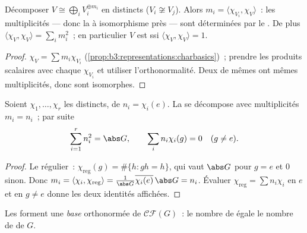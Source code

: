 \begin{corollary}\label{cor:b3:representations:multiplicity}
Décomposer $V \cong \bigoplus_i V_i^{\oplus m_i}$ en
 distincts ($V_i \not\cong V_j$). Alors $m_i =
\langle \chi_{V_i}, \chi_V\rangle$~: les multiplicités --- donc
la  à isomorphisme près --- sont déterminées par
le . De plus $\langle \chi_V, \chi_V\rangle = \sum_i
m_i^2$~; en particulier $V$ est  ssi
$\langle\chi_V, \chi_V\rangle = 1$.
\end{corollary}

\begin{proof}
$\chi_V = \sum m_i\chi_{V_i}$
(\cref{prop:b3:representations:charbasics})~; prendre les
produits scalaires avec chaque $\chi_{V_i}$ et utiliser
l'orthonormalité. Deux  de mêmes  ont
mêmes multiplicités, donc sont isomorphes.
\end{proof}

\begin{theorem}
\label{thm:b3:representations:regular}
Soient $\chi_1, \dots, \chi_r$ les  
distincts, de  $n_i = \chi_i(e)$. La  se décompose avec multiplicités $m_i = n_i$~; par
suite
\[
\sum_{i=1}^{r} n_i^2 = \abs G,
\qquad
\sum_i n_i\chi_i(g) = 0 \quad (g \neq e).
\]
\end{theorem}

\begin{proof}
Le  régulier~: $\chi_{\mathrm{reg}}(g) = \#\{h : gh =
h\}$, qui vaut $\abs G$ pour $g = e$ et $0$ sinon. Donc $m_i =
\langle \chi_i,\chi_{\mathrm{reg}}\rangle =
\frac1{\abs G}\overline{\chi_i(e)}\,\abs G = n_i$. Évaluer
$\chi_{\mathrm{reg}} = \sum n_i\chi_i$ en $e$ et en $g \neq e$
donne les deux identités affichées.
\end{proof}

\begin{theorem}\label{thm:b3:representations:numberirr}
Les   forment une \emph{base}
orthonormée de $\mathcal{CF}(G)$~: le nombre de  égale le nombre de  de $G$.
\end{theorem}


